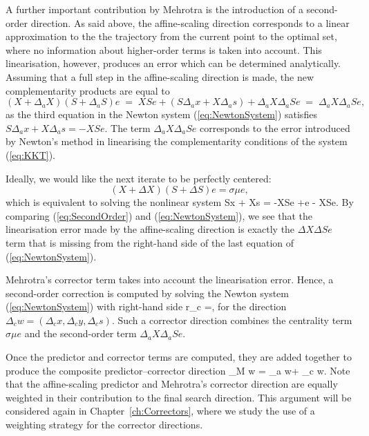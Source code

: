 A further important contribution by Mehrotra is the 
introduction of a second-order direction. 
As said above, the affine-scaling direction 
corresponds to a linear approximation to the the trajectory from 
the current point to the optimal set, where no information about 
higher-order terms is taken into account. This linearisation, 
however, produces an error which can be determined analytically.
%
Assuming that a full step in the affine-scaling direction is made, 
the new complementarity products are equal to
\[
  (X + \Delta_a X) (S + \Delta_a S) e 
   \;=\; XSe + (S \Delta_a x + X \Delta_a s) + \Delta_a X \Delta_a S e
   \;=\; \Delta_a X \Delta_a S e,
\]
as the third equation in the Newton system (\ref{eq:NewtonSystem}) satisfies 
$S \Delta_a x + X \Delta_a s = -XSe.$
%
The term $\Delta_a X \Delta_a S e$ corresponds to the error introduced
by Newton's method in linearising the complementarity conditions of 
the \KKT system (\ref{eq:KKT}).

Ideally, we would like the next iterate to be perfectly centered: 
\[
  (X+\Delta X)(S+\Delta S)e = \sigma\mu e,
\]
which is equivalent to solving the nonlinear system
\be  \label{eq:SecondOrder}
  S\Delta x + X\Delta s = -XSe +\sigma\mu e - \Delta X\Delta Se.
\ee
By comparing (\ref{eq:SecondOrder}) and (\ref{eq:NewtonSystem}),
we see that 
the linearisation error made by the affine-scaling direction is exactly 
the $\Delta X\Delta Se$ term that is missing from the right-hand side
of the last equation of (\ref{eq:NewtonSystem}).

Mehrotra's corrector term takes into account the linearisation error.
Hence, a second-order correction is computed by solving the Newton system 
(\ref{eq:NewtonSystem}) with right-hand side
\be \label{eq:MehrotraRhs}
r_c =,
\ee
for the direction $\Delta_c w = (\Delta_c x,\Delta_c y,\Delta_c s)$.
Such a corrector direction combines the centrality term $\sigma \mu e$
and the second-order term $\Delta_a X\Delta_a Se$.

Once the predictor and corrector terms are computed, they are 
added together to produce the composite predictor--corrector direction
\be \label{eq:CompositeDirection}
\Delta_M w = \Delta_a w+ \Delta_c w.
\ee
Note that the affine-scaling predictor and Mehrotra's corrector direction 
are equally weighted in their contribution to the final search direction. 
This argument will be considered again in Chapter~\ref{ch:Correctors}, 
where we study the use of a weighting strategy for the corrector
directions.

